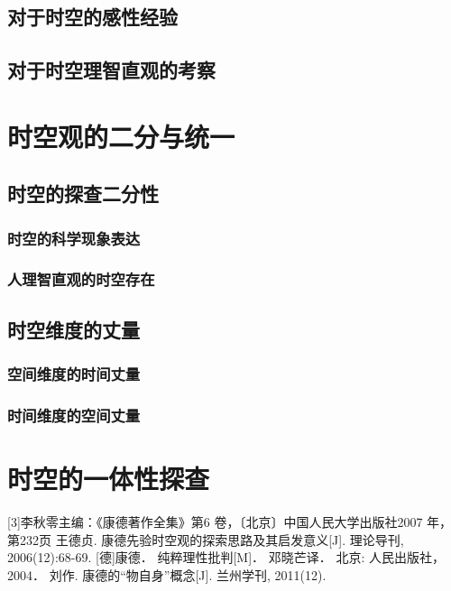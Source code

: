 \documentclass[lang=cn,11pt]{elegantpaper}
\begin{document}
\subsection{对于时空的感性经验}

\subsection{对于时空理智直观的考察}

\section{时空观的二分与统一}

\subsection{时空的探查二分性}

\subsubsection{时空的科学现象表达}

\subsubsection{人理智直观的时空存在}

\subsection{时空维度的丈量}

\subsubsection{空间维度的时间丈量}

\subsubsection{时间维度的空间丈量}

\section{时空的一体性探查}


\begin{thebibliography}{1}

  [3]李秋零主编：《康德著作全集》第6 卷，〔北京〕中国人民大学出版社2007 年，第232页
  王德贞. 康德先验时空观的探索思路及其启发意义[J]. 理论导刊, 2006(12):68-69.
  \bibitem{}[德]康德． 纯粹理性批判[M]． 邓晓芒译． 北京: 人民出版社，2004．
  \bibitem{}刘作. 康德的“物自身”概念[J]. 兰州学刊, 2011(12).

\end{thebibliography}
    
  
\end{document}

